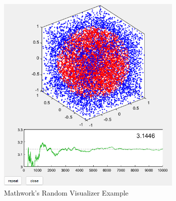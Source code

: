 \begin{figure}[H]
    \centering
    \includegraphics[width=0.8\textwidth]{Include/Images/Thesis/Development/Visualizers/RANDOMNESS/Mathworks.Random.Ex1.png}
    \caption{Mathwork's \cite{doi:10.1137/1.9780898717952} Random Visualizer Example}
    \label{fig:Mathwork's Random Visualizer Example}
\end{figure}

